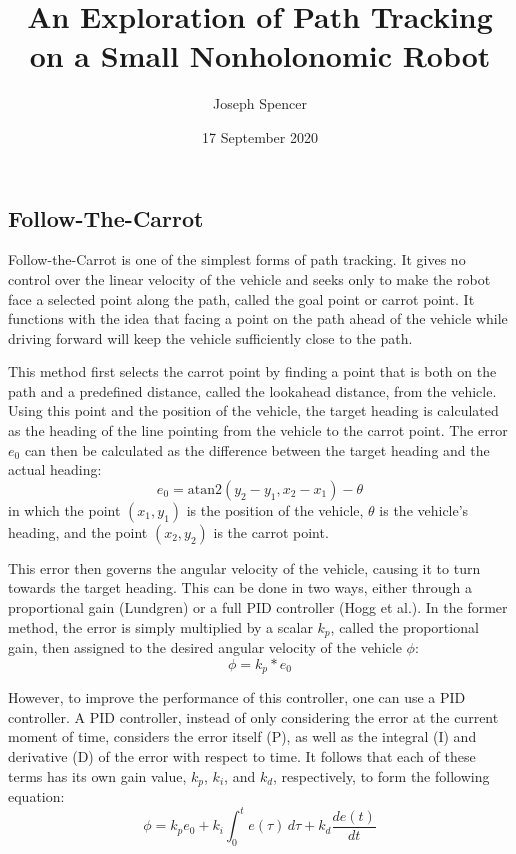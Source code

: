 \documentclass[mla7]{mla}
\title{An Exploration of Path Tracking on a Small Nonholonomic Robot}
\author{Joseph Spencer}
\date{17 September 2020}
\begin{document}
\begin{paper}

\section{Follow-The-Carrot}
Follow-the-Carrot is one of the simplest forms of path tracking. It gives no control over the linear velocity of the vehicle and seeks only to make the robot face a selected point along the path, called the goal point or carrot point. It functions with the idea that facing a point on the path ahead of the vehicle while driving forward will keep the vehicle sufficiently close to the path.

This method first selects the carrot point by finding a point that is both on the path and a predefined distance, called the lookahead distance, from the vehicle. Using this point and the position of the vehicle, the target heading is calculated as the heading of the line pointing from the vehicle to the carrot point. The error $e_0$ can then be calculated as the difference between the target heading and the actual heading:
\begin{equation}
 e_0 = \text{atan2}(y_2 - y_1,x_2 - x_1) - \theta
\end{equation}
in which the point $(x_1,y_1)$ is the position of the vehicle, $\theta$ is the vehicle's heading, and the point $(x_2,y_2)$ is the carrot point.

This error then governs the angular velocity of the vehicle, causing it to turn towards the target heading. This can be done in two ways, either through a proportional gain (Lundgren) or a full PID controller (Hogg et al.). In the former method, the error is simply multiplied by a scalar $k_p$, called the proportional gain, then assigned to the desired angular velocity of the vehicle $\phi$:
\begin{equation}
\phi = k_p * e_0
\end{equation}

However, to improve the performance of this controller, one can use a PID controller. A PID controller, instead of only considering the error at the current moment of time, considers the error itself (P), as well as the integral (I) and derivative (D) of the error with respect to time. It follows that each of these terms has its own gain value, $k_p$, $k_i$, and $k_d$, respectively, to form the following equation:
\begin{equation}
\phi = k_p e_0 + k_i \int_0^t \! e(\tau) \, d\tau + k_d \frac{de(t)}{dt}
\end{equation}


\end{paper}
\end{document}

